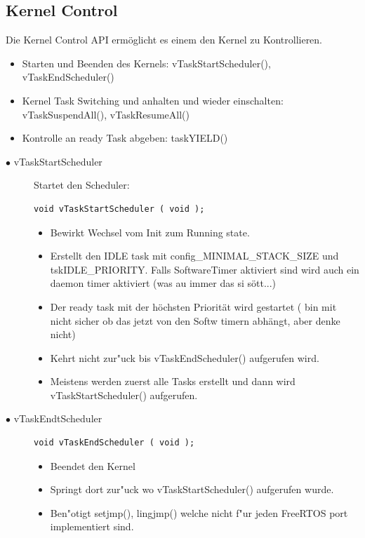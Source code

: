 \documentclass[a4paper, 8pt]{extarticle}
\begin{document}
\begin{multicols*}{3}
			\subsection{Kernel Control}
				Die Kernel Control API ermöglicht es einem den Kernel zu Kontrollieren.
				\begin{itemize}
					\item Starten und Beenden des Kernels: vTaskStartScheduler(), vTaskEndScheduler() 						
					\item Kernel Task Switching und anhalten und wieder einschalten: vTaskSuspendAll(), vTaskResumeAll()
					\item Kontrolle an ready Task abgeben: taskYIELD()
				\end{itemize}
				\begin{description}
					\item[$\bullet$ vTaskStartScheduler]
						Startet den Scheduler: 
						\begin{lstlisting}
void vTaskStartScheduler ( void );
						\end{lstlisting}  
						\begin{itemize}
							\item Bewirkt Wechsel vom Init zum Running state.						
							\item Erstellt den IDLE task mit config\_MINIMAL\_STACK\_SIZE und tskIDLE\_PRIORITY.
							      Falls SoftwareTimer aktiviert sind wird auch ein daemon timer aktiviert (was au immer das si sött...)
							\item Der ready task mit der höchsten Priorität wird gestartet ( bin mit nicht sicher ob das jetzt von den Softw timern abhängt, aber denke nicht)
							\item Kehrt nicht zur"uck bis vTaskEndScheduler()  aufgerufen wird.
							\item Meistens werden zuerst alle Tasks erstellt und dann wird vTaskStartScheduler() aufgerufen. 
						\end{itemize}
					\item[$\bullet$ vTaskEndtScheduler]
						\begin{lstlisting}
void vTaskEndScheduler ( void );
						\end{lstlisting} 
						\begin{itemize}
							\item Beendet den Kernel						
							\item Springt dort zur"uck wo vTaskStartScheduler() aufgerufen wurde.
							\item Ben"otigt setjmp(), lingjmp() welche nicht f"ur jeden FreeRTOS port implementiert sind.

\end{itemize}
\end{description}
\end{multicols*}
\end{document}
